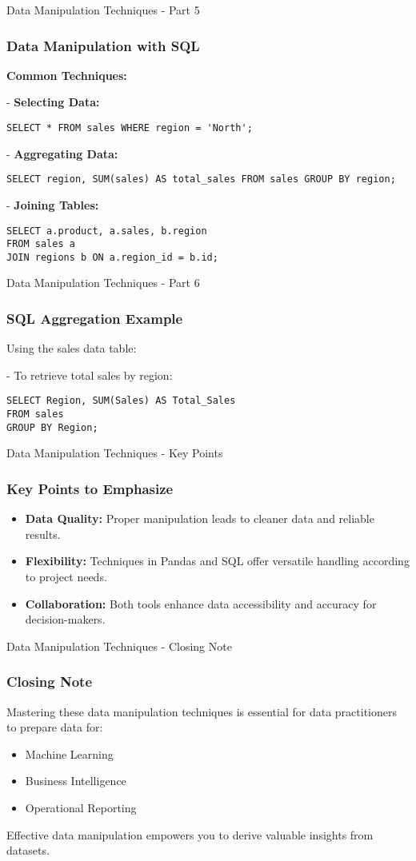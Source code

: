 \documentclass[aspectratio=169]{beamer}
\begin{document}
\begin{frame}[fragile]{Data Manipulation Techniques - Part 5}
    \frametitle{Data Manipulation with SQL}
    \textbf{Common Techniques:}
    
    - \textbf{Selecting Data:}
    \begin{lstlisting}
SELECT * FROM sales WHERE region = 'North';
    \end{lstlisting}
    
    - \textbf{Aggregating Data:}
    \begin{lstlisting}
SELECT region, SUM(sales) AS total_sales FROM sales GROUP BY region;
    \end{lstlisting}

    - \textbf{Joining Tables:}
    \begin{lstlisting}
SELECT a.product, a.sales, b.region
FROM sales a
JOIN regions b ON a.region_id = b.id;
    \end{lstlisting}
\end{frame}

\begin{frame}[fragile]{Data Manipulation Techniques - Part 6}
    \frametitle{SQL Aggregation Example}
    Using the sales data table:
    
    - To retrieve total sales by region:
    \begin{lstlisting}
SELECT Region, SUM(Sales) AS Total_Sales 
FROM sales 
GROUP BY Region;
    \end{lstlisting}
\end{frame}

\begin{frame}{Data Manipulation Techniques - Key Points}
    \frametitle{Key Points to Emphasize}
    \begin{itemize}
        \item \textbf{Data Quality:} Proper manipulation leads to cleaner data and reliable results.
        \item \textbf{Flexibility:} Techniques in Pandas and SQL offer versatile handling according to project needs.
        \item \textbf{Collaboration:} Both tools enhance data accessibility and accuracy for decision-makers.
    \end{itemize}
\end{frame}

\begin{frame}{Data Manipulation Techniques - Closing Note}
    \frametitle{Closing Note}
    Mastering these data manipulation techniques is essential for data practitioners to prepare data for:
    \begin{itemize}
        \item Machine Learning
        \item Business Intelligence
        \item Operational Reporting
    \end{itemize}
    Effective data manipulation empowers you to derive valuable insights from datasets.
\end{frame}
\end{document}
